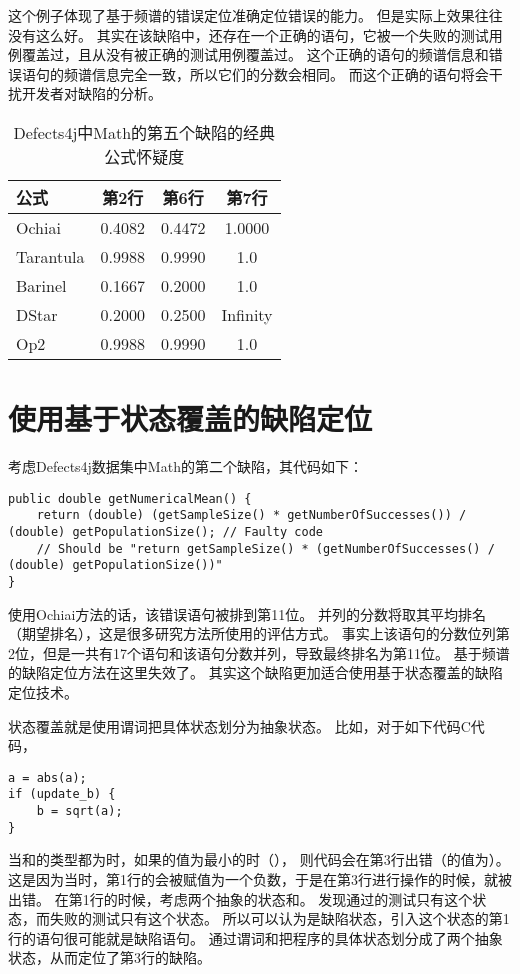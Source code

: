 这个例子体现了基于频谱的错误定位准确定位错误的能力。
但是实际上效果往往没有这么好。
其实在该缺陷中，还存在一个正确的语句，它被一个失败的测试用例覆盖过，且从没有被正确的测试用例覆盖过。
这个正确的语句的频谱信息和错误语句的频谱信息完全一致，所以它们的分数会相同。
而这个正确的语句将会干扰开发者对缺陷的分析。

\begin{table}
\centering
\begin{tabular}{|l|c|c|c|}
\hline
公式 & 第2行 & 第6行 & 第7行 \\
\hline
Ochiai & 0.4082 & 0.4472 & 1.0000 \\
\hline
Tarantula & 0.9988 & 0.9990 & 1.0 \\
\hline
Barinel & 0.1667 & 0.2000 & 1.0 \\
\hline
DStar & 0.2000 & 0.2500 & Infinity \\
\hline
Op2 & 0.9988 & 0.9990 & 1.0 \\
\hline
\end{tabular}
\caption{Defects4j中Math的第五个缺陷的经典公式怀疑度}
\label{math_5_susp}
\end{table}

\section{使用基于状态覆盖的缺陷定位}
\label{sec:state_based}

考虑Defects4j数据集中Math的第二个缺陷，其代码如下：
\lstset{language=Java}
\begin{lstlisting}
public double getNumericalMean() {
    return (double) (getSampleSize() * getNumberOfSuccesses()) / (double) getPopulationSize(); // Faulty code
    // Should be "return getSampleSize() * (getNumberOfSuccesses() / (double) getPopulationSize())"
}
\end{lstlisting}

使用Ochiai方法的话，该错误语句被排到第11位。
并列的分数将取其平均排名（期望排名），这是很多研究方法所使用的评估方式\parencite{Pearson2017Evaluating,Xuan2014Learning,Steimann2013Threats,Wong2016A}。
事实上该语句的分数位列第2位，但是一共有17个语句和该语句分数并列，导致最终排名为第11位。
基于频谱的缺陷定位方法在这里失效了。
其实这个缺陷更加适合使用基于状态覆盖的缺陷定位技术。

状态覆盖就是使用谓词把具体状态划分为抽象状态。
比如，对于如下代码C代码，
\lstset{language=C}
\begin{lstlisting}
a = abs(a);
if (update_b) {
    b = sqrt(a);
}
\end{lstlisting}
当和的类型都为时，如果的值为最小的时（），
则代码会在第3行出错（的值为）。
这是因为当时，第1行的会被赋值为一个负数，于是在第3行进行操作的时候，就被出错。
在第1行的时候，考虑两个抽象的状态和。
发现通过的测试只有这个状态，而失败的测试只有这个状态。
所以可以认为是缺陷状态，引入这个状态的第1行的语句很可能就是缺陷语句。
通过谓词和把程序的具体状态划分成了两个抽象状态，从而定位了第3行的缺陷。

